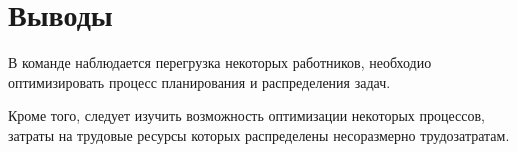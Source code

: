 \chapter{Выводы}

В команде наблюдается перегрузка некоторых работников, необходио оптимизировать процесс планирования и распределения задач.

Кроме того, следует изучить возможность оптимизации некоторых процессов, затраты на трудовые ресурсы которых распределены несоразмерно трудозатратам.